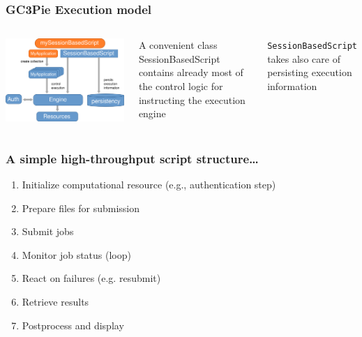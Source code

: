 \documentclass[english,serif,mathserif,xcolor=pdftex,dvipsnames,table]{beamer}
\begin{document}
\begin{frame}
  \frametitle{GC3Pie Execution model}
  \begin{columns}
      \includegraphics[width=1\textwidth]{fig/GC3Pie_execution_model}
  \begin{block}{}
    A convenient class {\color{Blue}SessionBasedScript} contains already
    most of the control logic for instructing the execution engine
  \end{block}

  \begin{block}{}
    \texttt{SessionBasedScript} takes also care of {\color{Blue}persisting}
    execution information
  \end{block}
  \end{columns}
\end{frame}


\begin{frame}
  \frametitle{A simple high-throughput script structure\ldots{}}

  \begin{enumerate}
  \item Initialize computational resource (e.g., authentication step)
  \item Prepare files for submission
  \item Submit jobs
  \item Monitor job status (loop)
  \item React on failures (e.g. resubmit)
  \item Retrieve results
  \item Postprocess and display
  \end{enumerate}
\end{frame}
\end{document}
